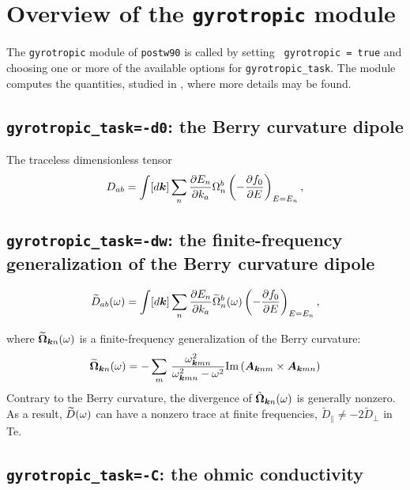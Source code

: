 \chapter{Overview of the {\tt gyrotropic} module \label{ch:gyrotropic}}


The {\tt gyrotropic} module of {\tt postw90} is called by setting {\tt
  gyrotropic = true} and choosing one or more of the available options for
{\tt gyrotropic\_task}. The module computes the quantities, studied in
 \cite{tsirkin-arxiv17}, where more details may be found.

\section{{\tt gyrotropic\_task=-d0}: the Berry curvature dipole  }

The traceless dimensionless tensor
\begin{equation}
\label{eq:D_ab}
D_{ab}=\int[d{\bm k}]\sum_n
\frac{\partial E_n}{\partial{k_a}}
\Omega_n^b
\left(-\frac{\partial f_0}{\partial E}\right)_{E=E_n},
\end{equation}


\section{{\tt gyrotropic\_task=-dw}: the finite-frequency generalization of the Berry curvature dipole  }

\begin{equation}
\label{eq:D-tilde}
\widetilde{D}_{ab}(\omega)=\int[d{\bm k}]\sum_n
\frac{\partial E_n}{\partial{k_a}}\widetilde\Omega^b_n(\omega)
\left(-\frac{\partial f_0}{\partial E}\right)_{E=E_n},
\end{equation}

where $\widetilde{\bm\Omega}_{{\bm k} n}(\omega)$ is a finite-frequency
generalization of the Berry curvature:
%
%
\begin{equation}
\label{eq:curv-w}
\widetilde{\bm\Omega}_{{\bm k} n}(\omega)=-
\sum_m\,\frac{\omega^2_{{\bm k} mn}}{\omega^2_{{\bm k} mn}-\omega^2}
{\rm Im}\left({\bm A}_{{\bm k} nm}\times{\bm A}_{{\bm k} mn}\right)
\end{equation}
Contrary to the Berry
  curvature, the divergence of $\tilde{\bm\Omega}_{{\bm k} n}(\omega)$ is
  generally nonzero. As a result, $\widetilde{D}(\omega)$
can have a nonzero trace at finite frequencies, $\tilde{D}_\|\neq-2\tilde{D}_\perp$ in Te.

\section{{\tt gyrotropic\_task=-C}: the ohmic  conductivity }

